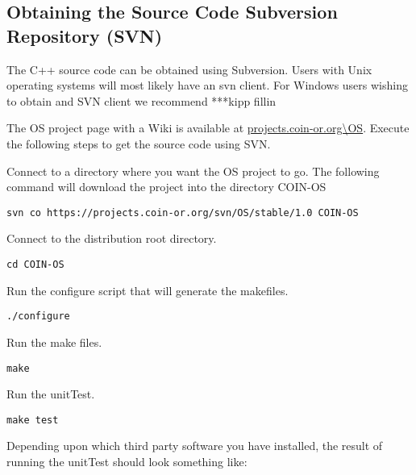 \documentclass[12pt]{article}
\renewcommand{\_}{{\char"5F}}
\renewcommand{\{}{{\char"7B}}
\renewcommand{\}}{{\char"7D}}
\renewcommand{\^}{{\char"0D}}
\renewcommand{\'}{{\char"0D}}
\begin{document}
\subsection{Obtaining the Source Code Subversion Repository (SVN)}

The C++ source code can be obtained using Subversion.  Users with Unix operating systems will most likely have an svn client. For Windows users wishing to obtain and SVN client we recommend ***kipp fillin 

The OS project page with a Wiki is available at \url{projects.coin-or.org\OS}. Execute the following steps to get the source code using SVN.

  Connect to a directory where you want the OS project to go.  The following command will download the project into the directory COIN-OS

\begin{verbatim}
svn co https://projects.coin-or.org/svn/OS/stable/1.0 COIN-OS
\end{verbatim}

  Connect to the distribution root directory.

\begin{verbatim}
cd COIN-OS
\end{verbatim}


 Run the configure script that will generate the makefiles. 

\begin{verbatim}
./configure
\end{verbatim}

  Run the make files.

\begin{verbatim}
make
\end{verbatim}

 Run the unitTest.

\begin{verbatim}
make test
\end{verbatim}

Depending upon which third party software you have installed, the result of running the unitTest should look something like:
\end{document}
